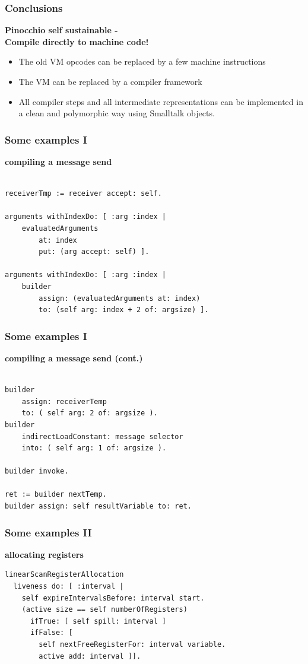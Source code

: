 \documentclass{beamer}
\begin{document}
\begin{frame}[fragile]
    \frametitle{Conclusions}
    {\bf Pinocchio self sustainable - \\Compile directly to machine code!}
    \begin{itemize}
        \item The old VM opcodes can be replaced by a few machine instructions
        \item The VM can be replaced by a compiler framework
        \item All compiler steps and all intermediate representations can 
            be implemented in a clean and polymorphic way using Smalltalk objects.
    \end{itemize}
\end{frame}

\begin{frame}[fragile]
    \frametitle{Some examples I}
    {\bf compiling a message send}
    \begin{lstlisting}

receiverTmp := receiver accept: self.
    
arguments withIndexDo: [ :arg :index |
    evaluatedArguments 
        at: index 
        put: (arg accept: self) ].
    
arguments withIndexDo: [ :arg :index |
    builder
        assign: (evaluatedArguments at: index)
        to: (self arg: index + 2 of: argsize) ].
    \end{lstlisting}
\end{frame}

\begin{frame}[fragile]
    \frametitle{Some examples I}
    {\bf compiling a message send (cont.)}
    \begin{lstlisting}
    
builder 
    assign: receiverTemp 
    to: ( self arg: 2 of: argsize ).
builder 
    indirectLoadConstant: message selector 
    into: ( self arg: 1 of: argsize ).
        
builder invoke.

ret := builder nextTemp.
builder assign: self resultVariable to: ret.

    \end{lstlisting}
\end{frame}

\begin{frame}[fragile]
    \frametitle{Some examples II}
    {\bf allocating registers}
    \begin{lstlisting}
linearScanRegisterAllocation
  liveness do: [ :interval |
    self expireIntervalsBefore: interval start.
    (active size == self numberOfRegisters)
      ifTrue: [ self spill: interval ]
      ifFalse: [ 
        self nextFreeRegisterFor: interval variable.  
        active add: interval ]].
    \end{lstlisting}
\end{frame}
\end{document}
